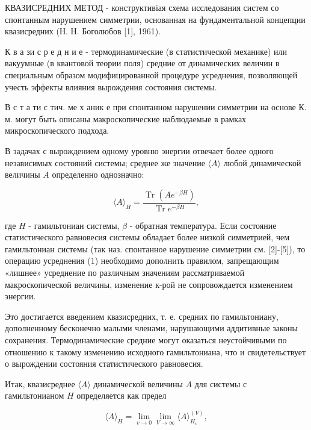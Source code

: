 \documentclass[10pt]{article}
\begin{document}
КВАЗИСРЕДНИХ МЕТОД - конструктивіая схема исследования систем со спонтанным нарушением симметрии, основанная на фундаментальной концепции квазисредних (Н. Н. Боголюбов [1], 1961).



К в а зи с р е д н и е - термодинамические (в статистической механике) или вакуумные (в квантовой теории поля) средние от динамических величин в специальным образом модифицированной процедуре усреднения, позволяющей учесть эффекты влияния вырождения состояния системы.



В с т а ти с тич. ме х аник е при спонтанном нарушении симметрии на основе К. м. могут быть описаны макроскопические наблюдаемые в рамках микроскопического подхода.



В задачах с вырождением одному уровню энергии отвечает более одного независимых состояний системы; среднее же значение $\langle A\rangle$ любой динамической величины $A$ определенно однозначно:



\[

\langle A\rangle_{H}=\frac{\operatorname{Tr}\left(A e^{-\beta H}\right)}{\operatorname{Tr} e^{-\beta H}},

\]



где $H$ - гамильтониан системы, $\beta$ - обратная температура. Если состояние статистического равновесия системы обладает более низкой симметрией, чем гамильтониан системы (так наз. спонтанное нарушение симметрии см. [2]-[5]), то операцию усреднения (1) необходимо дополнить правилом, запрещающим «лишнее» усреднение по различным значениям рассматриваемой макроскопической величины, изменение к-рой не сопровождается изменением энергии.



Это достигается введением квазисредних, т. е. средних по гамильтониану, дополненному бесконечно малыми членами, нарушающими аддитивные законы сохранения. Термодинамические средние могут оказаться неустойчивыми по отношению к такому изменению исходного гамильтониана, что и свидетельствует о вырождении состояния статистического равновесия.



Итак, квазисреднее $\langle A\rangle$ динамической величины $A$ для системы с гамильтонианом $H$ определяется как предел



\[

\langle A\rangle_{H}=\lim _{v \rightarrow 0} \lim _{V \rightarrow \infty}\langle A\rangle_{H_{v}}^{(V)},

\]
\end{document}
